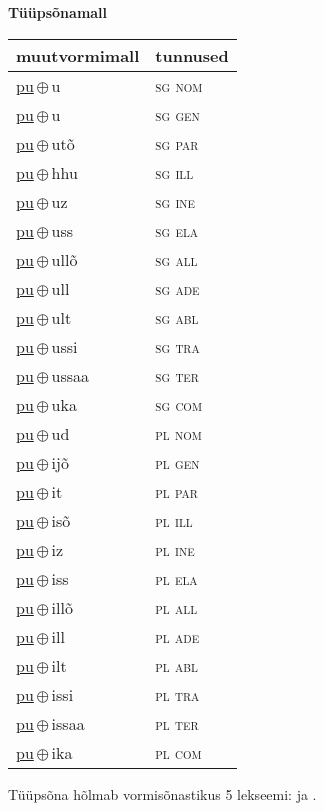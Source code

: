 

\vspace{3.5em}
\noindent \begin{minipage}{\textwidth}
\noindent \textbf{Tüüpsõnamall \,}\\

\begin{sideways}
\begin{tabular}{l l}
muutvormimall & tunnused \\
\hline
\underline{pu}\,$\oplus$\,u & \textsc{ sg nom } \\
\underline{pu}\,$\oplus$\,u & \textsc{ sg gen } \\
\underline{pu}\,$\oplus$\,utõ & \textsc{ sg par } \\
\underline{pu}\,$\oplus$\,hhu & \textsc{ sg ill } \\
\underline{pu}\,$\oplus$\,uz & \textsc{ sg ine } \\
\underline{pu}\,$\oplus$\,uss & \textsc{ sg ela } \\
\underline{pu}\,$\oplus$\,ullõ & \textsc{ sg all } \\
\underline{pu}\,$\oplus$\,ull & \textsc{ sg ade } \\
\underline{pu}\,$\oplus$\,ult & \textsc{ sg abl } \\
\underline{pu}\,$\oplus$\,ussi & \textsc{ sg tra } \\
\underline{pu}\,$\oplus$\,ussaa & \textsc{ sg ter } \\
\underline{pu}\,$\oplus$\,uka & \textsc{ sg com } \\
\underline{pu}\,$\oplus$\,ud & \textsc{ pl nom } \\
\underline{pu}\,$\oplus$\,ijõ & \textsc{ pl gen } \\
\underline{pu}\,$\oplus$\,it & \textsc{ pl par } \\
\underline{pu}\,$\oplus$\,isõ & \textsc{ pl ill } \\
\underline{pu}\,$\oplus$\,iz & \textsc{ pl ine } \\
\underline{pu}\,$\oplus$\,iss & \textsc{ pl ela } \\
\underline{pu}\,$\oplus$\,illõ & \textsc{ pl all } \\
\underline{pu}\,$\oplus$\,ill & \textsc{ pl ade } \\
\underline{pu}\,$\oplus$\,ilt & \textsc{ pl abl } \\
\underline{pu}\,$\oplus$\,issi & \textsc{ pl tra } \\
\underline{pu}\,$\oplus$\,issaa & \textsc{ pl ter } \\
\underline{pu}\,$\oplus$\,ika & \textsc{ pl com } \\
\end{tabular}
\end{sideways}
\label{tab:tüüpsõnamall-puu}

\end{minipage}

 
\vspace{1em}
\noindent Tüüpsõna hõlmab vormisõnastikus 5 lekseemi:  ja .
